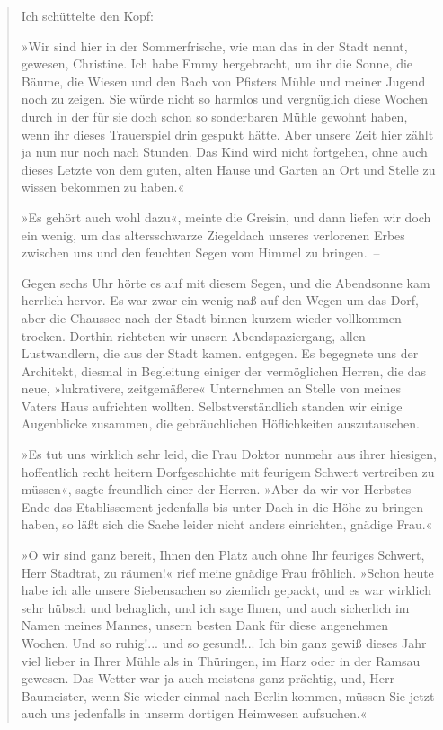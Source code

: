 \begin{verse}
Ich schüttelte den Kopf:

»Wir sind hier in der Sommerfrische, wie man das in der Stadt
nennt, gewesen, Christine. Ich habe Emmy hergebracht, um ihr die
Sonne, die Bäume, die Wiesen und den Bach von Pfisters Mühle und
meiner Jugend noch zu zeigen. Sie würde nicht so harmlos und
vergnüglich diese Wochen durch in der für sie doch schon so
sonderbaren Mühle gewohnt haben, wenn ihr dieses Trauerspiel drin
gespukt hätte. Aber unsere Zeit hier zählt ja nun nur noch nach
Stunden. Das Kind wird nicht fortgehen, ohne auch dieses Letzte von
dem guten, alten Hause und Garten an Ort und Stelle zu wissen
bekommen zu haben.«

»Es gehört auch wohl dazu«, meinte die Greisin, und dann liefen wir
doch ein wenig, um das altersschwarze Ziegeldach unseres verlorenen
Erbes zwischen uns und den feuchten Segen vom Himmel zu bringen.~–

Gegen sechs Uhr hörte es auf mit diesem Segen, und die Abendsonne
kam herrlich hervor. Es war zwar ein wenig naß auf den Wegen um das
Dorf, aber die Chaussee nach der Stadt binnen kurzem wieder
vollkommen trocken. Dorthin richteten wir unsern Abendspaziergang,
allen Lustwandlern, die aus der Stadt kamen. entgegen. Es begegnete
uns der Architekt, diesmal in Begleitung einiger der vermöglichen
Herren, die das neue, »lukrativere, zeitgemäßere« Unternehmen an
Stelle von meines Vaters Haus aufrichten wollten.
Selbstverständlich standen wir einige Augenblicke zusammen, die
gebräuchlichen Höflichkeiten auszutauschen.

»Es tut uns wirklich sehr leid, die Frau Doktor nunmehr aus ihrer
hiesigen, hoffentlich recht heitern Dorfgeschichte mit feurigem
Schwert vertreiben zu müssen«, sagte freundlich einer der Herren.
»Aber da wir vor Herbstes Ende das Etablissement jedenfalls bis
unter Dach in die Höhe zu bringen haben, so läßt sich die Sache
leider nicht anders einrichten, gnädige Frau.«

»O wir sind ganz bereit, Ihnen den Platz auch ohne Ihr feuriges
Schwert, Herr Stadtrat, zu räumen!« rief meine gnädige Frau
fröhlich. »Schon heute habe ich alle unsere Siebensachen so
ziemlich gepackt, und es war wirklich sehr hübsch und behaglich,
und ich sage Ihnen, und auch sicherlich im Namen meines Mannes,
unsern besten Dank für diese angenehmen Wochen. Und so ruhig!...
und so gesund!... Ich bin ganz gewiß dieses Jahr viel lieber in
Ihrer Mühle als in Thüringen, im Harz oder in der Ramsau gewesen.
Das Wetter war ja auch meistens ganz prächtig, und, Herr
Baumeister, wenn Sie wieder einmal nach Berlin kommen, müssen Sie
jetzt auch uns jedenfalls in unserm dortigen Heimwesen aufsuchen.«


\end{verse}
